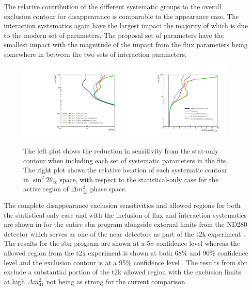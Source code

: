 The relative contribution of the different systematic groups to the overall exclusion contour for \nue disappearance is comparable to the \nue appearance case. The interaction systematics again have the largest impact the majority of which is due to the modern set of parameters. The proposal set of parameters have the smallest impact with the magnitude of the impact from the flux parameters being somewhere in between the two sets of interaction parameters.

\begin{figure}[h!]
    \centering
    \includegraphics[width = 0.49\textwidth]{figures-chap6/exclusion_contours/nue_disapp_syst_groups.pdf}
    \includegraphics[width = 0.49\textwidth]{figures-chap6/exclusion_contours/nue_disapp_syst_groups_ratios.pdf}
    \caption[\nue app sensitivity reduction from different systematic groups.]{The left plot shows the reduction in sensitivity from the stat-only contour when including each set of systematic parameters in the fits. The right plot shows the relative location of each systematic contour in $\sin^{2}2\theta_{ee}$ space, with respect to the statistical-only case for the active region of $\Delta m_{41}^{2}$ phase space.}
    \label{fig:nue_disapp_syst_groups}
\end{figure}

\newpage
The complete \nue disappearance exclusion sensitivities and allowed regions for both the statistical only case and with the inclusion of flux and interaction systematics are shown in  for the entire \gls{sbn} program alongside external limits from the ND280 detector which serves as one of the near detectors as part of the \gls{t2k} experiment \cite{t2k_experiment}. The results for the \gls{sbn} program are shown at a 5$\sigma$ confidence level whereas the allowed region from the \gls{t2k} experiment is shown at both 68\% and 90\% confidence level and the exclusion contour is at a 95\% confidence level \cite{T2K_nue_disapp_contour}. The results from \gls{sbn} exclude a substantial portion of the \gls{t2k} allowed region with the exclusion limits at high $\Delta m^2_{41}$ not being as strong for the current comparison. 

